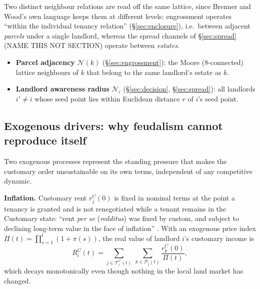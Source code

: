 \documentclass[11pt,english]{article}
\begin{document}
Two distinct neighbour relations are read off the same lattice, since Brenner and Wood's own language keeps them at different levels: engrossment operates ``within the individual tenancy relation'' (\S\ref{sec:enclosure}), i.e.\ between adjacent \emph{parcels} under a single landlord, whereas the spread channels of \S\ref{sec:spread} (NAME THIS NOT SECTION) operate between \emph{estates}.
\begin{itemize}
\item \textbf{Parcel adjacency} $\mathcal{N}(k)$ (\S\ref{sec:engrossment}): the Moore (8-connected) lattice neighbours of $k$ that belong to the same landlord's estate as $k$.
\item \textbf{Landlord awareness radius} $\mathcal{N}_i$ (\S\ref{sec:decision}, \S\ref{sec:spread}): all landlords $i'\neq i$ whose seed point lies within Euclidean distance $r$ of $i$'s seed point.
\end{itemize}

\subsection{Exogenous drivers: why feudalism cannot reproduce itself}
\label{sec:exogenous}

Two exogenous processes represent the standing pressure that makes the customary order unsustainable on its own terms, independent of any competitive dynamic.

\textbf{Inflation.} Customary rent $r_j^{C}(0)$ is fixed in nominal terms at the point a tenancy is granted and is not renegotiated while a tenant remains in the Customary state: ``rent \textit{per se} (\textit{redditus}) was fixed by custom, and subject to declining long-term value in the face of inflation'' \cite[p.61]{brenner1976agrarian}. With an exogenous price index $\Pi(t) = \prod_{s=1}^{t}(1+\pi(s))$, the real value of landlord $i$'s customary income is
\begin{equation}
R_i^{C}(t) = \sum_{j \in \mathcal{T}_i^{C}(t)}\ \sum_{k \in \mathcal{P}_j(t)} \frac{r_k^{C}(0)}{\Pi(t)},
\end{equation}
which decays monotonically even though nothing in the local land market has changed.
\end{document}
